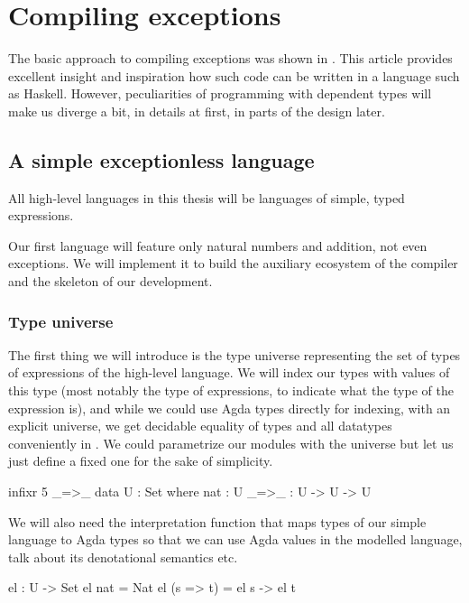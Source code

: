 \chapter{Compiling exceptions}

The basic approach to compiling exceptions was shown in \cite{gmh:exceptions}.
This article provides excellent insight and inspiration how such code can be written
in a language such as Haskell.
However, peculiarities of programming with dependent types will make us
diverge a bit, in details at first, in parts of the design later.

\section{A simple exceptionless language}

All high-level languages in this thesis will be languages of simple, typed
expressions.

Our first language will feature only natural numbers and addition, not even
exceptions. We will implement it to build the auxiliary ecosystem of the
compiler and the skeleton of our development.


\subsection{Type universe}

The first thing we will introduce is the type universe representing the set of
types of expressions of the high-level language. We will index our types with
values of this type (most notably the type  of expressions, to
indicate what the type of the expression is), and while we could use Agda types
directly for indexing, with an explicit universe, we get decidable equality of
types and all datatypes conveniently in . We could parametrize our
modules with the universe but let us just define a fixed one for the sake of
simplicity.

\begin{code}
  infixr 5 _=>_
  data U : Set where
    nat : U
    _=>_ : U -> U -> U
\end{code}

\noindent We will also need the interpretation function  that maps
types of our simple language to Agda types so that we can use Agda values in
the modelled language, talk about its denotational semantics etc.

\begin{code}
  el : U -> Set
  el nat = Nat
  el (s => t) = el s -> el t
\end{code}

